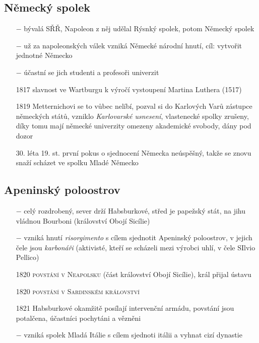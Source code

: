 \documentclass{article}
\begin{document}
\subsection*{Německý spolek}
\begin{itemize}
    \vspace{-0.5em}
    \setlength\itemsep{0.15em}
    \item[$-$] bývalá SŘŘ, Napoleon z něj udělal Rýsnký spolek, potom Německý spolek
    \item[$-$] už za napoleonských válek vzniká Německé národní hnutí, cíl: vytvořit jednotné Německo
    \item[$-$] účastní se jich studenti a profesoři univerzit
    \item[1817] slavnost ve Wartburgu k výročí vystoupení Martina Luthera (1517)
    \item[1819] Metternichovi se to vůbec nelíbí, pozval si do Karlových Varů zástupce německých států, vzniklo \textit{Karlovarské usnesení}, vlastenecké spolky zrušeny, díky tomu mají německé univerzity omezeny akademické svobody, dány pod dozor
    \item[30. léta 19. st.] první pokus o sjednocení Německa neúspěšný, takže se znovu snaží scházet ve spolku Mladé Německo
\end{itemize}

\subsection*{Apeninský poloostrov}
\begin{itemize}
    \vspace{-0.5em}
    \setlength\itemsep{0.15em}
    \item[$-$] celý rozdrobený, sever drží Habsburkové, střed je papežský stát, na jihu vládnou Bourboni (království Obojí Sicílie)
    \item[$-$] vzniká hnutí \textit{risorgimento} s cílem sjednotit Apeninský poloostrov, v jejich čele jsou \textit{karbonáři} (aktivisté, kteří se scházeli mezi výrobci uhlí, v čele SIlvio Pellico)
    \item[1820] \textsc{povstání v Neapolsku} (část království Obojí Sicílie), král přijal ústavu
    \item[1820] \textsc{povstání v Sardinském království}
    \item[1821] Habsburkové okamžitě posílají intervenční armádu, povstání jsou potalčena, účastníci pochytáni a vězněni
    \item[$-$] vzniká spolek Mladá Itálie s cílem sjednoti itálii a vyhnat cizí dynastie
\end{itemize}
\end{document}
